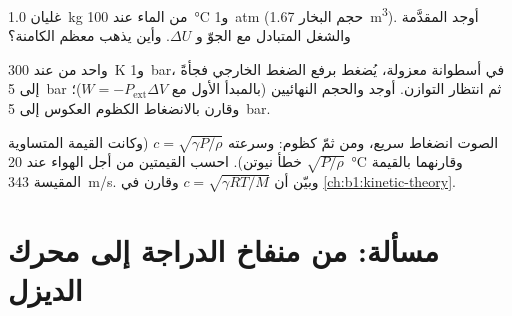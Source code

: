 \begin{exercise}[$\star\star\star$]\label{exo:b1:first-law:10}
غليان \qty{1.0}{kg} من الماء عند \qty{100}{\degreeCelsius} و\qty{1}{atm}
(حجم البخار \qty{1.67}{m^3}). أوجد  المقدَّمة والشغل المتبادل مع
الجوّ و $\Delta U$. وأين يذهب معظم  الكامنة؟
\end{exercise}

\begin{exercise}[$\star\star\star$]\label{exo:b1:first-law:11}
 واحد من  عند \qty{300}{K} و\qty{1}{bar}، في أسطوانة
معزولة، يُضغط برفع الضغط الخارجي فجأةً إلى
\qty{5}{bar} ثم انتظار التوازن. أوجد  والحجم النهائيين
(بالمبدأ الأول مع $W = -P_{\mathrm{ext}}\Delta V$)؛ وقارن بالانضغاط
الكظوم العكوس إلى \qty{5}{bar}.
\end{exercise}

\begin{exercise}[$\star\star\star$]\label{exo:b1:first-law:12}
الصوت انضغاط سريع، ومن ثمّ كظوم: وسرعته $c = \sqrt{\gamma P/\rho}$
(وكانت القيمة المتساوية  $\sqrt{P/\rho}$ خطأ نيوتن). احسب القيمتين
من أجل الهواء عند \qty{20}{\degreeCelsius} وقارنهما بالقيمة المقيسة
\qty{343}{m/s}. وبيّن أن $c = \sqrt{\gamma RT/M}$ وقارن  في \cref{ch:b1:kinetic-theory}.
\end{exercise}

\section{مسألة: من منفاخ الدراجة إلى محرك الديزل}

